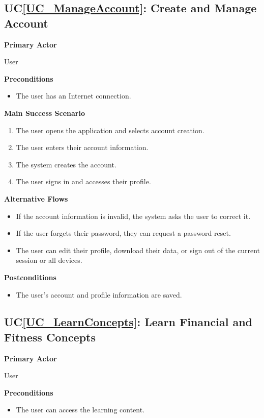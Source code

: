 \documentclass[12pt]{article}
\newcounter{ucnum} %
\newcommand{\ucref}[1]{UC\ref{#1}}
\begin{document}
\label{UC_ManageAccount}
\subsection{\ucref{UC_ManageAccount}: Create and Manage Account}

\textbf{Primary Actor}

User

\textbf{Preconditions}
\begin{itemize}
\item The user has an Internet connection.
\end{itemize}

\textbf{Main Success Scenario}
\begin{enumerate}
\item The user opens the application and selects account creation.
\item The user enters their account information.
\item The system creates the account.
\item The user signs in and accesses their profile.
\end{enumerate}

\textbf{Alternative Flows}
\begin{itemize}
\item If the account information is invalid, the system asks the user to correct it.
\item If the user forgets their password, they can request a password reset.
\item The user can edit their profile, download their data, or sign out
of the current session or all devices.
\end{itemize}

\textbf{Postconditions}
\begin{itemize}
\item The user's account and profile information are saved.
\end{itemize}


\label{UC_LearnConcepts}
\subsection{\ucref{UC_LearnConcepts}: Learn Financial and Fitness Concepts}

\textbf{Primary Actor}

User

\textbf{Preconditions}
\begin{itemize}
\item The user can access the learning content.
\end{itemize}
\end{document}
